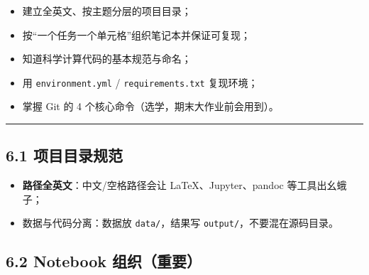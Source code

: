 \begin{itemize}
\tightlist
\item
  建立全英文、按主题分层的项目目录；
\item
  按``一个任务一个单元格''组织笔记本并保证可复现；
\item
  知道科学计算代码的基本规范与命名；
\item
  用 \texttt{environment.yml} / \texttt{requirements.txt} 复现环境；
\item
  掌握 Git 的 4 个核心命令（选学，期末大作业前会用到）。
\end{itemize}

\begin{center}\rule{0.5\linewidth}{0.5pt}\end{center}

\subsection{6.1
项目目录规范}\label{ux9879ux76eeux76eeux5f55ux89c4ux8303}

\begin{Shaded}
\begin{Highlighting}[]
\end{Highlighting}
\end{Shaded}

\begin{itemize}
\tightlist
\item
  \textbf{路径全英文}：中文/空格路径会让 LaTeX、Jupyter、pandoc
  等工具出幺蛾子；
\item
  数据与代码分离：数据放 \texttt{data/}，结果写
  \texttt{output/}，不要混在源码目录。
\end{itemize}

\subsection{6.2 Notebook
组织（重要）}\label{notebook-ux7ec4ux7ec7ux91cdux8981}

